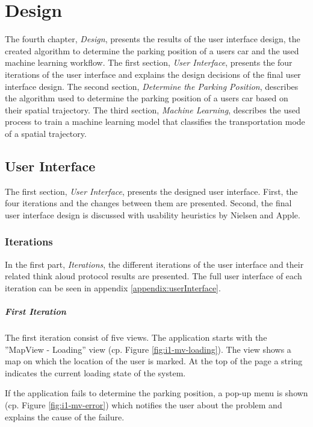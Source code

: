 \chapter{Design}
The fourth chapter, \textit{Design}, presents the results of the user interface design, the created algorithm to determine the parking position of a users car and the used machine learning workflow. The first section, \textit{User Interface}, presents the four iterations of the user interface and explains the design decisions of the final user interface design. The second section, \textit{Determine the Parking Position}, describes the algorithm used to determine the parking position of a users car based on their spatial trajectory. The third section, \textit{Machine Learning}, describes the used process to train a machine learning model that classifies the transportation mode of a spatial trajectory.

\section{User Interface}
The first section, \textit{User Interface}, presents the designed user interface. First, the four iterations and the changes between them are presented. Second, the final user interface design is discussed with usability heuristics by Nielsen and Apple.

\subsection{Iterations}
In the first part, \textit{Iterations}, the different iterations of the user interface and their related think aloud protocol results are presented. The full user interface of each iteration can be seen in appendix \ref{appendix:userInterface}.

\paragraph{First Iteration}

The first iteration consist of five views. The application starts with the ''MapView - Loading'' view (cp. Figure \ref{fig:i1-mv-loading}). The view shows a map on which the location of the user is marked. At the top of the page a string indicates the current loading state of the system.

If the application fails to determine the parking position, a pop-up menu is shown (cp. Figure \ref{fig:i1-mv-error}) which notifies the user about the problem and explains the cause of the failure. 


